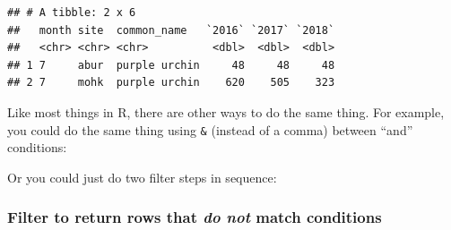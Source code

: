 \documentclass[]{book}
\newenvironment{Shaded}{\begin{snugshade}}{\end{snugshade}}
\newcommand{\CommentTok}[1]{\textcolor[rgb]{0.56,0.35,0.01}{\textit{#1}}}
\newcommand{\KeywordTok}[1]{\textcolor[rgb]{0.13,0.29,0.53}{\textbf{#1}}}
\newcommand{\NormalTok}[1]{#1}
\newcommand{\OperatorTok}[1]{\textcolor[rgb]{0.81,0.36,0.00}{\textbf{#1}}}
\newcommand{\StringTok}[1]{\textcolor[rgb]{0.31,0.60,0.02}{#1}}
\begin{document}
\begin{verbatim}
## # A tibble: 2 x 6
##   month site  common_name   `2016` `2017` `2018`
##   <chr> <chr> <chr>          <dbl>  <dbl>  <dbl>
## 1 7     abur  purple urchin     48     48     48
## 2 7     mohk  purple urchin    620    505    323
\end{verbatim}

Like most things in R, there are other ways to do the same thing. For example, you could do the same thing using \texttt{\&} (instead of a comma) between ``and'' conditions:

\begin{Shaded}
\end{Shaded}

Or you could just do two filter steps in sequence:

\begin{Shaded}
\end{Shaded}

\hypertarget{filter-to-return-rows-that-do-not-match-conditions}{%
\subsubsection{\texorpdfstring{Filter to return rows that \emph{do not} match conditions}{Filter to return rows that do not match conditions}}\label{filter-to-return-rows-that-do-not-match-conditions}}
\end{document}
